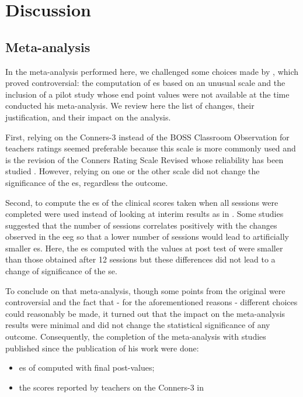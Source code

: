 


\section{Discussion}

\subsection{Meta-analysis} 

In the meta-analysis performed here, we challenged some choices made by \citeauthor{Cortese2016}, which proved controversial: 
the computation of \gls{es} based on an unusual scale \citep{Steiner2014} and the inclusion of a pilot study \citep{Arnold2014} 
whose end point values were not available at the time \citeauthor{Cortese2016} conducted his meta-analysis. We review here the 
list of changes, their justification, and their impact on the analysis.
 
First, relying on the Conners-3 \citep{Conners2011} instead of the BOSS Classroom Observation \citep{Shapiro2010} for
teachers ratings seemed preferable because this scale is more commonly used \citep{Christiansen2014, Bluschke2016} and is
the revision of the Conners Rating Scale Revised \citep{Conners1998} whose reliability has been studied \citep{Collett2003}. 
However, relying on one or the other scale did not change the significance of the \gls{es}, regardless the outcome.

Second, to compute the \gls{es} of \citet{Arnold2014} the clinical scores taken when all sessions were completed were 
used instead of looking at interim results as in \citeauthor{Cortese2016}. Some studies suggested that the number of sessions 
correlates positively with the changes observed in the \gls{eeg} \citep{Vernon2004} so that a lower number of sessions would 
lead to artificially smaller \gls{es}. Here, the \gls{es} computed with the values at post test of \citet{Arnold2014} were smaller 
than those obtained after 12 sessions but these differences did not lead to a change of significance of the \gls{se}. 

To conclude on that meta-analysis, though some points from the original were controversial and the fact that - for the aforementioned 
reasons - different choices could reasonably be made, it turned out that the impact on the
meta-analysis results were minimal and did not change the statistical significance of any outcome. Consequently, the
completion of the meta-analysis with studies published since the publication of his work were done:
\begin{itemize} 
  \item \gls{es} of \citet{Arnold2014} computed with final post-values; 
  \item the scores reported by teachers on the Conners-3 in \citeauthor{Steiner2014}
\end{itemize} 

